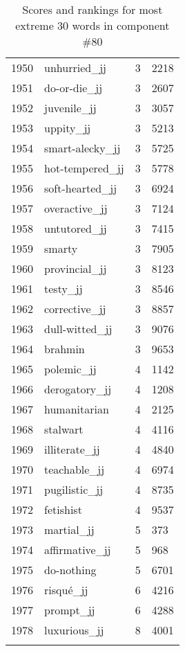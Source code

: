 \begin{longtable}[!htbp]{| rlr@{.}l |}
    1950 & unhurried\_jj & 3 & 2218 \\
    1951 & do-or-die\_jj & 3 & 2607 \\
    1952 & juvenile\_jj & 3 & 3057 \\
    1953 & uppity\_jj & 3 & 5213 \\
    1954 & smart-alecky\_jj & 3 & 5725 \\
    1955 & hot-tempered\_jj & 3 & 5778 \\
    1956 & soft-hearted\_jj & 3 & 6924 \\
    1957 & overactive\_jj & 3 & 7124 \\
    1958 & untutored\_jj & 3 & 7415 \\
    1959 & smarty & 3 & 7905 \\
    1960 & provincial\_jj & 3 & 8123 \\
    1961 & testy\_jj & 3 & 8546 \\
    1962 & corrective\_jj & 3 & 8857 \\
    1963 & dull-witted\_jj & 3 & 9076 \\
    1964 & brahmin & 3 & 9653 \\
    1965 & polemic\_jj & 4 & 1142 \\
    1966 & derogatory\_jj & 4 & 1208 \\
    1967 & humanitarian & 4 & 2125 \\
    1968 & stalwart & 4 & 4116 \\
    1969 & illiterate\_jj & 4 & 4840 \\
    1970 & teachable\_jj & 4 & 6974 \\
    1971 & pugilistic\_jj & 4 & 8735 \\
    1972 & fetishist & 4 & 9537 \\
    1973 & martial\_jj & 5 & 373 \\
    1974 & affirmative\_jj & 5 & 968 \\
    1975 & do-nothing & 5 & 6701 \\
    1976 & risqué\_jj & 6 & 4216 \\
    1977 & prompt\_jj & 6 & 4288 \\
    1978 & luxurious\_jj & 8 & 4001 \\
    \hline
    \caption{Scores and rankings for most extreme 30 words in component \#80} \\
\end{longtable}
